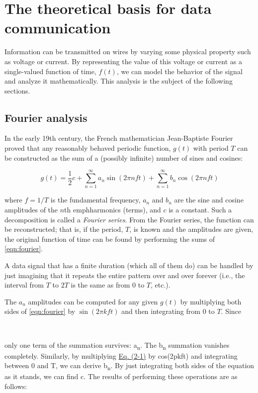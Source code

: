 \documentclass[b5paper,11pt]{memoir}
\begin{document}
\section{The theoretical basis for data communication}

Information can be transmitted on wires by varying some physical property such as voltage or current.
By representing the value of this voltage or current as a single-valued function of time, $f(t)$, we can model the behavior of the signal and analyze it mathematically.
This analysis is the subject of the following sections.


\subsection{Fourier analysis}

In the early 19th century, the French mathematician Jean-Baptiste Fourier proved that any reasonably behaved periodic function, $g(t)$ with period $T$ can be constructed as the sum of a (possibly infinite) number of sines and cosines:

\begin{equation}
g(t) = \frac{1}{2}c + \sum_{n=1}^\infty a_n \sin(2\pi nft) + \sum_{n=1}^\infty b_n \cos(2\pi nft) \label{eqn:fourier}
\end{equation}

where $f = 1/T$ is the fundamental frequency, $a_n$ and $b_n$ are the sine and cosine amplitudes of the $n$th emph{harmonics} (terms), and $c$ is a constant.
Such a decomposition is called a \emph{Fourier series}.
From the Fourier series, the function can be reconstructed; that is, if the period, $T$, is known and the amplitudes are given, the original function of time can be found by
performing the sums of \cref{eqn:fourier}.

A data signal that has a finite duration (which all of them do) can be
handled by just imagining that it repeats the entire pattern over and
over forever (i.e., the interval from $T$ to $2T$ is the same as from $0$ to $T$, etc.).

The $a_n$ amplitudes can be computed for any given $g(t)$ by multiplying both sides of \cref{eqn:fourier} by $\sin(2\pi kft)$ and then integrating from 0 to $T$.
Since


~

only one term of the summation survives: {a}{\textsubscript{n}}{.} The
{b}{\textsubscript{n}} summation vanishes completely. Similarly, by
multiplying
\protect\hyperlink{0130661023_ch02lev1sec1.htmlux5cux23ch02eq01}{Eq.
(2-1)} by cos(2{p}{kft}) and integrating between 0 and {T}, we can
derive {b}{\textsubscript{n}}{.} By just integrating both sides of the
equation as it stands, we can find {c}. The results of performing these
operations are as follows:
\end{document}
